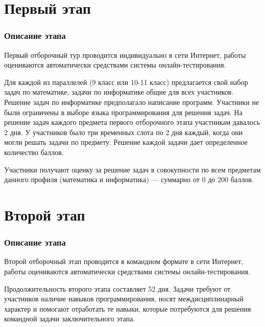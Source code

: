 \documentclass[a4paper,12pt,oneside]{book}
\begin{document}

\setcounter{tocdepth}{1}

\tableofcontents



\part{Первый этап}

\newpage

\section*{Описание этапа}

Первый отборочный тур проводится индивидуально в сети Интернет, работы оцениваются автоматически средствами системы онлайн-тестирования.

Для каждой из параллелей (9 класс или 10-11 класс) предлагается свой набор задач по математике, задачи по информатике общие для всех участников. Решение задач по информатике предполагало написание программ. Участники не были ограничены в выборе языка программирования для решения задач. На решение задач каждого предмета первого отборочного этапа участникам давалось 2 дня. У участников было три временных слота по 2 дня каждый, когда они могли решать задачи по предмету. Решение каждой задачи дает определенное количество баллов.

Участники получают оценку за решение задач в совокупности по всем предметам данного профиля (математика и информатика) --- суммарно от 0 до 200 баллов.
  


 
\part{Второй этап}
\newpage

\section*{Описание этапа}

Второй отборочный этап проводится в командном формате в сети Интернет, работы оцениваются автоматически средствами системы онлайн-тестирования.

Продолжительность второго этапа составляет 52 дня. Задачи требуют от участников наличие навыков программирования, носят междисциплинарный характер и помогают отработать те навыки, которые потребуются для решения командной задачи заключительного этапа.
\end{document}
